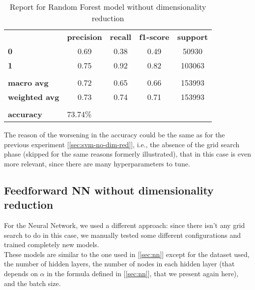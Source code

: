 \begin{table}[h!]
    \centering
    \begin{tabular}{lcccc}
        \rowcolor[HTML]{EEEEEE} 
        \cellcolor[HTML]{FBFBFB} & \textbf{precision} & \textbf{recall} & \textbf{f1-score} & \textbf{support} \\
        \rowcolor[HTML]{EEEEEE} 
        \textbf{0}               & 0.69               & 0.38            & 0.49              & 50930            \\
        \rowcolor[HTML]{EEEEEE} 
        \textbf{1}               & 0.75               & 0.92            & 0.82              & 103063           \\
        \rowcolor[HTML]{FBFBFB} 
        &                    &                 &                   &                  \\
        \rowcolor[HTML]{EEEEEE} 
        \textbf{macro avg}       & 0.72               & 0.65            & 0.66              & 153993           \\
        \rowcolor[HTML]{EEEEEE} 
        \textbf{weighted avg}    & 0.73               & 0.74            & 0.71              & 153993           \\
        \rowcolor[HTML]{FBFBFB} 
        &                    &                 &                   &                  \\
        \rowcolor[HTML]{EEEEEE} 
        \textbf{accuracy}        & \multicolumn{4}{l}{\cellcolor[HTML]{EEEEEE}73.74\%}                         
    \end{tabular}
    \caption{Report for Random Forest model without dimensionality reduction}
    \label{tab:rf-res-no-dim-red}
\end{table}

The reason of the worsening in the accuracy could be the same as for the previous experiment [\ref{sec:svm-no-dim-red}], i.e., the absence of the grid search phase (skipped for the same reasons formerly illustrated), that in this case is even more relevant, since there are many hyperparameters to tune.


\newpage
\subsection{Feedforward NN without dimensionality reduction} \label{sec:nn-no-dim-red}

For the Neural Network, we used a different approach: since there isn't any grid search to do in this case, we manually tested some different configurations and trained completely new models.\\
These models are similar to the one used in [\ref{sec:nn}] except for the dataset used, the number of hidden layers, the number of nodes in each hidden layer (that depends on $\alpha$ in the formula defined in [\ref{sec:nn}], that we present again here), and the batch size.


